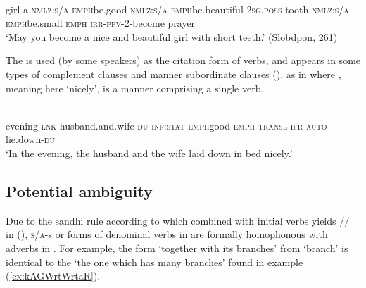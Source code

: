 \documentclass[output=paper]{langsci/langscibook}
\begin{document}
\begin{exe}
\ex \label{ex:kWpWpe}
\gll
{} 	 	 	 	 	 	 	 	  \\
girl a \textsc{nmlz:\textsc{s\slash a}-emph}\tld{}be.good \textsc{nmlz:\textsc{s\slash a}-emph}\tld{}be.beautiful  \textsc{2sg.poss}-tooth \textsc{nmlz:\textsc{s\slash a}-emph}\tld{}be.small \textsc{emph} \textsc{irr-pfv}-\textsc{2}-become prayer \\
\glt `May you become a nice and beautiful girl with short teeth.' (Slobdpon, 261)
\end{exe}

The  is used (by some speakers) as the citation form of verbs, and appears in some types of complement clauses and manner subordinate clauses (\citealt[271--272; 321--325]{jacques14linking}), as in  where , meaning here `nicely', is a manner  comprising a single verb.
 \begin{exe}
\ex \label{ex:kWpWpe2}
\gll {} 	 	 	 	 	 	  \\
evening \textsc{lnk} husband.and.wife \textsc{du} \textsc{inf:stat-emph}\tld{}good \textsc{emph} \textsc{transl-ifr-auto}-lie.down-\textsc{du} \\
\glt `In the evening, the husband and the wife laid down in bed nicely.'
\end{exe}


\subsection{Potential ambiguity}
Due to the sandhi rule according to which  combined with initial verbs yields // in  (\citealt{jacques04these}), \textsc{s\slash a}-s or  forms of denominal verbs in  are formally homophonous with  adverbs in . For example, the form   `together with its branches' from  `branch' is identical to the   `the one which has many branches' found in example (\ref{ex:kAGWrtWrtaR}).
\end{document}
